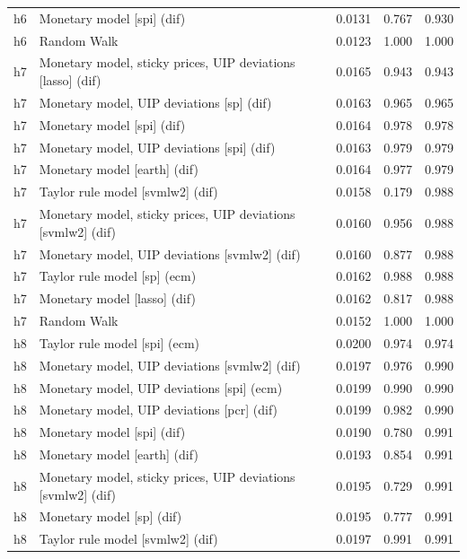 \begin{ThreePartTable}
\begin{longtable}[t]{cp{5.5cm}ccc}
h6 & \raggedright Monetary model [spi] (dif) & 0.0131 & 0.767 & 0.930\\
h6 & \raggedright Random Walk & 0.0123 & 1.000 & 1.000\\
\addlinespace
h7 & \raggedright Monetary model, sticky prices, UIP deviations [lasso] (dif) & 0.0165 & 0.943 & 0.943\\
h7 & \raggedright Monetary model, UIP deviations [sp] (dif) & 0.0163 & 0.965 & 0.965\\
h7 & \raggedright Monetary model [spi] (dif) & 0.0164 & 0.978 & 0.978\\
h7 & \raggedright Monetary model, UIP deviations [spi] (dif) & 0.0163 & 0.979 & 0.979\\
h7 & \raggedright Monetary model [earth] (dif) & 0.0164 & 0.977 & 0.979\\
h7 & \raggedright Taylor rule model [svmlw2] (dif) & 0.0158 & 0.179 & 0.988\\
h7 & \raggedright Monetary model, sticky prices, UIP deviations [svmlw2] (dif) & 0.0160 & 0.956 & 0.988\\
h7 & \raggedright Monetary model, UIP deviations [svmlw2] (dif) & 0.0160 & 0.877 & 0.988\\
h7 & \raggedright Taylor rule model [sp] (ecm) & 0.0162 & 0.988 & 0.988\\
h7 & \raggedright Monetary model [lasso] (dif) & 0.0162 & 0.817 & 0.988\\
h7 & \raggedright Random Walk & 0.0152 & 1.000 & 1.000\\
\addlinespace
h8 & \raggedright Taylor rule model [spi] (ecm) & 0.0200 & 0.974 & 0.974\\
h8 & \raggedright Monetary model, UIP deviations [svmlw2] (dif) & 0.0197 & 0.976 & 0.990\\
h8 & \raggedright Monetary model, UIP deviations [spi] (ecm) & 0.0199 & 0.990 & 0.990\\
h8 & \raggedright Monetary model, UIP deviations [pcr] (dif) & 0.0199 & 0.982 & 0.990\\
h8 & \raggedright Monetary model [spi] (dif) & 0.0190 & 0.780 & 0.991\\
h8 & \raggedright Monetary model [earth] (dif) & 0.0193 & 0.854 & 0.991\\
h8 & \raggedright Monetary model, sticky prices, UIP deviations [svmlw2] (dif) & 0.0195 & 0.729 & 0.991\\
h8 & \raggedright Monetary model [sp] (dif) & 0.0195 & 0.777 & 0.991\\
h8 & \raggedright Taylor rule model [svmlw2] (dif) & 0.0197 & 0.991 & 0.991\\

\end{longtable}
\end{ThreePartTable}
